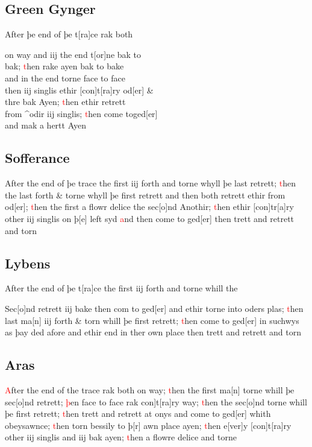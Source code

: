 \documentclass[12pt,letter]{article} %
\newcommand{\red}[1]{\textcolor{red}{#1}}
\newcommand{\srcpg}[1]{
    \noindent{
        \color{Gray}{\rule[0.5ex]{\linewidth}{1pt}~#1} 
    
    }
}
\begin{document}
\subsection{Green Gynger}
After þe end of þe t{[}ra{]}ce rak both
\srcpg{63}
on way and iij the end t{[}or{]}ne bak to\\
bak; \red{t}hen rake ayen bak to bake\\
and in the end torne face to face\\
then iij singlis ethir {[}con{]}t{[}ra{]}ry od{[}er{]} \&\\
thre bak Ayen; \red{t}hen ethir retrett\\
from \^{}odir iij singlis; \red{t}hen come toged{[}er{]}\\
and mak a hertt Ayen

\subsection{Sofferance}
After the end of þe trace the first iij forth and torne whyll þe last
retrett; \red{t}hen the last forth \& torne whyll þe first retrett and then 
both retrett ethir from od{[}er{]}; \red{t}hen the first a flowr delice the
sec{[}o{]}nd Anothir; \red{t}hen ethir {[}con{]}tr{[}a{]}ry other iij singlis
on þ{[}e{]} left syd \red{a}nd then come to ged{[}er{]} then trett and retrett
and torn

\subsection{Lybens}
After the end of þe t{[}ra{]}ce the first iij forth and torne whill the
\srcpg{64} Sec{[}o{]}nd retrett iij bake then com to ged{[}er{]} and
ethir torne into oders plas; \red{t}hen last ma{[}n{]} iij forth \& torn whill
þe first retrett; \red{t}hen come to ged{[}er{]} in suchwys as þay ded afore
and ethir end in ther own place then trett and retrett and torn

\subsection{Aras}
\red{A}fter the end of the trace rak both on way; \red{t}hen the first ma{[}n{]}
torne whill þe sec{[}o{]}nd retrett; \red{þ}en face to face rak
\marginnote{2}{[}con{]}t{[}ra{]}ry way; \red{t}hen the sec{[}o{]}nd torne whill þe first
retrett; \red{t}hen trett and retrett at onys and come to ged{[}er{]} whith
obeysawnce; \red{t}hen torn bessily to þ{[}r{]} awn place ayen; \red{t}hen
e{[}ver{]}y {[}con{]}t{[}ra{]}ry other iij singlis and iij bak ayen;
\red{t}hen a flowre delice and torne
\end{document}
